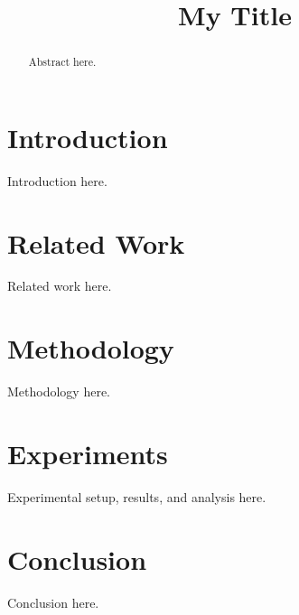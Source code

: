 \documentclass[sigplan, 10pt, review, anonymous]{acmart}
\begin{document}
\title{My Title}

\begin{abstract}
Abstract here.
\end{abstract}


\maketitle

\section{Introduction}
\label{sec:intro}
Introduction here.

\section{Related Work}
\label{sec:related_work}
Related work here.

\section{Methodology}
\label{sec:method}
Methodology here.

\section{Experiments}
\label{sec:experiments}
Experimental setup, results, and analysis here.

\section{Conclusion}
\label{sec:conclusion}
Conclusion here.




\end{document}
